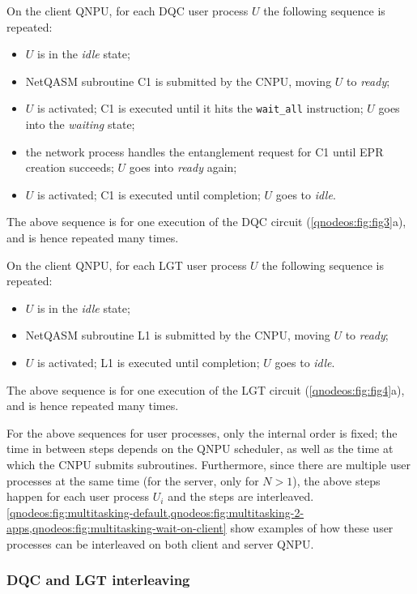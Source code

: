 On the client \ac{QNPU}, for each \ac{DQC} user process $U$ the following sequence is repeated:
%
\begin{itemize}
    \item $U$ is in the \textit{idle} state;
    \item \ac{NetQASM} subroutine C1 is submitted by the \ac{CNPU}, moving $U$ to \textit{ready};
    \item $U$ is activated; C1 is executed until it hits the \texttt{wait\_all} instruction; $U$ goes into the \textit{waiting} state;
    \item the network process handles the entanglement request for C1 until \ac{EPR} creation succeeds; $U$ goes into \textit{ready} again;
    \item $U$ is activated; C1 is executed until completion; $U$ goes to \textit{idle}.
\end{itemize}
%
The above sequence is for one execution of the \ac{DQC} circuit (\cref{qnodeos:fig:fig3}a), and is hence repeated many times.

On the client \ac{QNPU}, for each \ac{LGT} user process $U$ the following sequence is repeated:
%
\begin{itemize}
    \item $U$ is in the \textit{idle} state;
    \item \ac{NetQASM} subroutine L1 is submitted by the \ac{CNPU}, moving $U$ to \textit{ready};
    \item $U$ is activated; L1 is executed until completion; $U$ goes to \textit{idle}.
\end{itemize}
%
The above sequence is for one execution of the \ac{LGT} circuit (\cref{qnodeos:fig:fig4}a), and is hence repeated many times.

For the above sequences for user processes, only the internal order is fixed; the time in between steps depends on the \ac{QNPU} scheduler, as well as the time at which the \ac{CNPU} submits subroutines. Furthermore, since there are multiple user processes at the same time (for the server, only for $N > 1$), the above steps happen for each user process $U_i$ and the steps are interleaved. \cref{qnodeos:fig:multitasking-default,qnodeos:fig:multitasking-2-apps,qnodeos:fig:multitasking-wait-on-client} show examples of how these user processes can be interleaved on both client and server \ac{QNPU}.

\subsubsection{DQC and LGT interleaving}


